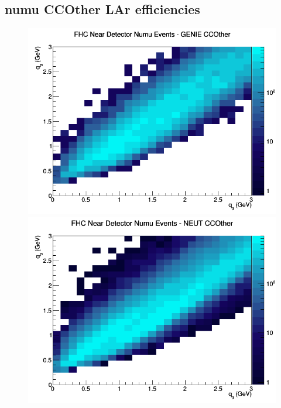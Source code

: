 \documentclass[12pt]{article}
\begin{document}
\subsection{numu CCOther LAr efficiencies}
\begin{figure}[h]
\includegraphics[width=\linewidth]{eff_q0_q3/LAr/CCOther_FHC_ND_numu_q3_q0_GENIE.png}
\endminipage
{}
\includegraphics[width=\linewidth]{eff_q0_q3/LAr/CCOther_FHC_ND_numu_q3_q0_NEUT.png}
\endminipage
{}

\end{figure}
\end{document}
